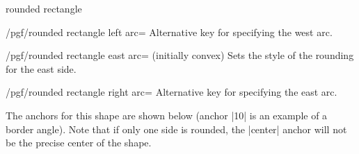 \begin{shape}{rounded rectangle}
    \begin{stylekey}{/pgf/rounded rectangle left arc=}
        Alternative key for specifying the west arc.
    \end{stylekey}

    \begin{key}{/pgf/rounded rectangle east arc= (initially convex)}
        Sets the style of the rounding for the east side.
    \end{key}

    \begin{stylekey}{/pgf/rounded rectangle right arc=}
        Alternative key for specifying the east arc.
    \end{stylekey}

    The anchors for this shape are shown below (anchor |10| is an example of a
    border angle). Note that if only one side is rounded, the |center| anchor
    will not be the precise center of the shape.
\begin{codeexample}[preamble={\usetikzlibrary{shapes.misc}}]
\Huge
{}
\end{codeexample}
\end{shape}

